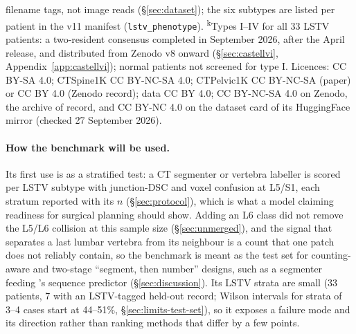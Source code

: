 \begin{table}[h]
filename tags, not image reads (\S\ref{sec:dataset}); the six subtypes are listed per
patient in the v11 manifest (\texttt{lstv\_phenotype}).
\textsuperscript{k}Types I--IV for all 33 LSTV patients: a two-resident consensus completed
in September 2026, after the April release, and distributed from Zenodo v8 onward
(\S\ref{sec:castellvi}, Appendix~\ref{app:castellvi}); normal patients not screened for
type I.
Licences: \VerSe{} CC BY-SA 4.0; CTSpine1K CC BY-NC-SA 4.0; CTPelvic1K CC BY-NC-SA (paper)
or CC BY 4.0 (Zenodo record); \TS{} data CC BY 4.0; \dataset{} CC BY-NC-SA 4.0 on Zenodo, the
archive of record, and CC BY-NC 4.0 on the dataset card of its HuggingFace mirror (checked
27 September 2026).
\end{table}

\paragraph{How the benchmark will be used.}
Its first use is as a stratified test: a CT segmenter or vertebra labeller is scored per
LSTV subtype with junction-DSC and voxel confusion at L5/S1,
each stratum reported with its $n$ (\S\ref{sec:protocol}), which is what a model claiming
readiness for surgical planning should show. Adding an L6 class did not remove the L5/L6
collision at this sample size (\S\ref{sec:unmerged}), and the signal that separates a last
lumbar vertebra from its neighbour is a count that one patch does not reliably contain, so
the benchmark is meant as the test set for counting-aware and two-stage ``segment, then
number'' designs, such as a segmenter feeding \VERIDAH{}'s sequence predictor
(\S\ref{sec:discussion}). Its LSTV strata are small (33 patients, 7 with an LSTV-tagged
held-out record; Wilson intervals for strata of 3--4 cases start at 44--51\%,
\S\ref{sec:limits-test-set}), so it exposes a failure mode and its direction rather than
ranking methods that differ by a few points.
